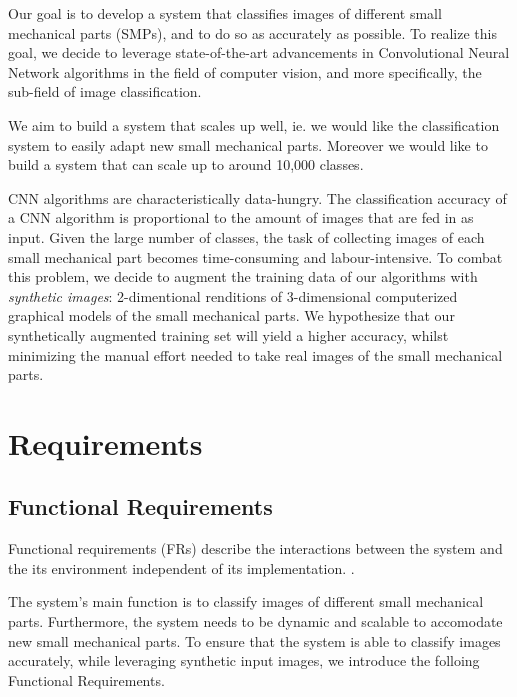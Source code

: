 \documentclass[a4paper,12pt,twoside]{report}
\begin{document}
Our goal is to develop a system that classifies images of different small mechanical parts (SMPs), and to do so as accurately as possible. To realize this goal, we decide to leverage state-of-the-art advancements in Convolutional Neural Network algorithms in the field of computer vision, and more specifically, the sub-field of image classification.

We aim to build a system that scales up well, ie. we would like the classification system to easily adapt new small mechanical parts. Moreover we would like to build a system that can scale up to around 10,000 classes.

CNN algorithms are characteristically data-hungry. The classification accuracy of a CNN algorithm is proportional to the amount of images that are fed in as input. Given the large number of classes, the task of collecting images of each small mechanical part becomes time-consuming and labour-intensive. To combat this problem, we decide to augment the training data of our algorithms with \textit{synthetic images}: 2-dimentional renditions of 3-dimensional computerized graphical models of the small mechanical parts. We hypothesize that our synthetically augmented training set will yield a higher accuracy, whilst minimizing the manual effort needed to take real images of the small mechanical parts.

\section{Requirements}

\subsection{Functional Requirements}

Functional requirements (FRs) describe the interactions between the system and the its environment independent of its implementation. \cite{bruegge2004object}.

The system's main function is to classify images of different small mechanical parts. Furthermore, the system needs to be dynamic and scalable to accomodate new small mechanical parts. To ensure that the system is able to classify images accurately, while leveraging synthetic input images, we introduce the folloing Functional Requirements.
\end{document}
